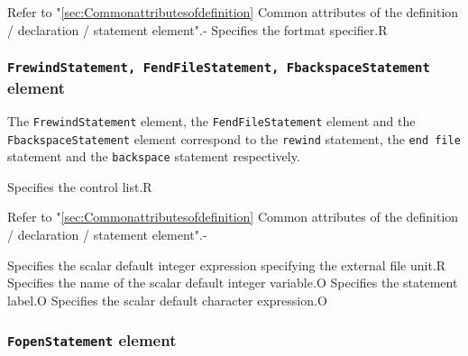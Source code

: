 \begin{XcodeMLAttributes}
{Refer to "\ref{sec:Commonattributesofdefinition} Common attributes of the definition / declaration / statement element".}{-}
{Specifies the fortmat specifier.}{R}
\end{XcodeMLAttributes}


\subsubsection{ {\tt FrewindStatement, FendFileStatement, FbackspaceStatement} element}

The {\tt FrewindStatement} element, the {\tt FendFileStatement} element and the {\tt FbackspaceStatement} element
correspond to the {\tt rewind} statement, the {\tt end file} statement and the {\tt backspace} statement respectively.


\begin{XcodeMLChildElements}
{Specifies the control list.}{R}
\end{XcodeMLChildElements}

\begin{XcodeMLAttributes}
{Refer to "\ref{sec:Commonattributesofdefinition} Common attributes of the definition / declaration / statement element".}{-}
\end{XcodeMLAttributes}

\begin{XcodeMLControlList}
{Specifies the scalar default integer expression specifying the external file unit.}{R}
{Specifies the name of the scalar default integer variable.}{O}
{Specifies the statement label.}{O}
{Specifies the scalar default character expression.}{O}
\end{XcodeMLControlList}


\subsubsection{ {\tt FopenStatement} element}

